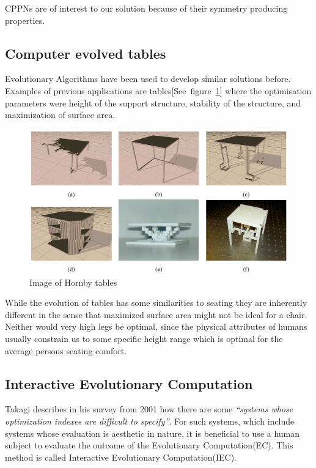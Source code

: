 CPPNs are of interest to our solution because of their symmetry producing 
properties.

\subsection{Computer evolved tables}
Evolutionary Algorithms have been used to develop similar solutions before. 
Examples of previous  applications are 
tables[See~figure~\ref{fig:hornby_tables}] where the optimisation parameters 
were height of the support structure, stability of the structure, and 
maximization of surface area.
\begin{figure}[ht]
\includegraphics[scale=.6]{content/img/tables}
\caption{Image of Hornby tables\cite{paper:ev4}}
\label{fig:hornby_tables}
\end{figure}

While the evolution of tables has some similarities to seating they are 
inherently
different in the sense that maximized surface area might not be ideal for a
chair.
Neither would very high legs be optimal, since the physical attributes of humans
usually constrain us to some specific height range which is optimal for the
average persons seating comfort.

\subsection{Interactive Evolutionary Computation}
Takagi describes in his survey from 2001\cite{Takagi2001} how there are some 
\emph{``systems whose optimization indexes are difficult to 
specify''}\cite[p.~1275]{Takagi2001}.
For such systems, which include systems whose evaluation is aesthetic in 
nature, it is beneficial to use a human subject to evaluate the outcome of the 
Evolutionary Computation(EC).
This method is called Interactive Evolutionary Computation(IEC).

